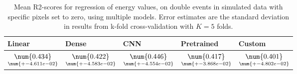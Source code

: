 \begin{table}
\centering
\caption{
Mean R2-scores for regression of energy values, on double events in simulated data with specific pixels
set to zero, using multiple models. Error estimates are the standard deviation in results from k-fold 
cross-validation with $K=5$ folds.
}
\label{tab:regression-simulated-double-energy-pixelmod-r2}
\begin{tabular}{lllll}
\toprule
                                             Linear &                                               Dense &                                                 CNN &                                          Pretrained &                                              Custom \\
\midrule
 $\underset{\num{+- 4.611e-02 }  }{\num{ 0.434 } }$ &  $\underset{\num{+- 4.583e-02 }  }{\num{ 0.422 } }$ &  $\underset{\num{+- 4.554e-02 }  }{\num{ 0.446 } }$ &  $\underset{\num{+- 3.868e-02 }  }{\num{ 0.417 } }$ &  $\underset{\num{+- 4.802e-02 }  }{\num{ 0.401 } }$ \\
\bottomrule
\end{tabular}
\end{table}
